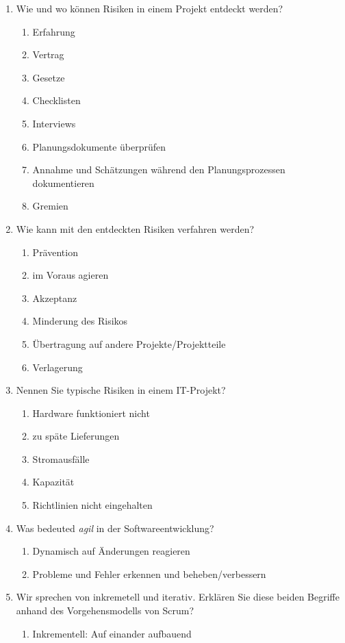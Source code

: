\documentclass[12pt,a4paper]{article}
\begin{document}
\begin{enumerate}
	\item Wie und wo können Risiken in einem Projekt entdeckt werden?
	\begin{enumerate}
		\item Erfahrung
		\item Vertrag
		\item Gesetze
		\item Checklisten
		\item Interviews
		\item Planungsdokumente überprüfen
		\item Annahme und Schätzungen während den Planungsprozessen dokumentieren
		\item Gremien
	\end{enumerate}
	\item Wie kann mit den entdeckten Risiken verfahren werden?
	\begin{enumerate}
		\item Prävention
		\item im Voraus agieren
		\item Akzeptanz
		\item Minderung des Risikos
		\item Übertragung auf andere Projekte/Projektteile
		\item Verlagerung
	\end{enumerate}
	\item Nennen Sie typische Risiken in einem IT-Projekt?
	\begin{enumerate}
		\item Hardware funktioniert nicht
		\item zu späte Lieferungen
		\item Stromausfälle
		\item Kapazität
		\item Richtlinien nicht eingehalten
	\end{enumerate}
	\item Was bedeuted \textit{agil} in der Softwareentwicklung?
	\begin{enumerate}
		\item Dynamisch auf Änderungen reagieren
		\item Probleme und Fehler erkennen und beheben/verbessern
	\end{enumerate}
	\item Wir sprechen von inkremetell und iterativ. Erklären Sie diese beiden Begriffe anhand des Vorgehensmodells von Scrum?
	\begin{enumerate}
		\item Inkrementell: Auf einander aufbauend

\end{enumerate}
\end{enumerate}
\end{document}
